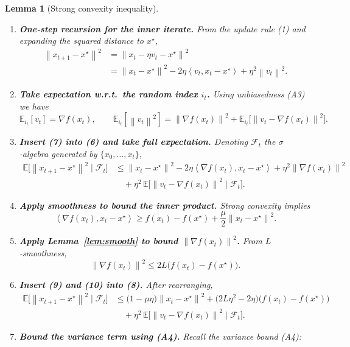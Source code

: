 \documentclass{article}
\newtheorem{lemma}{Lemma}
\newcommand{\E}{\mathbb{E}}
\newcommand{\norm}[1]{\left\lVert#1\right\rVert}
\newcommand{\inner}[2]{\left\langle #1,#2\right\rangle}
\begin{document}
\begin{lemma}[Strong convexity inequality]
\begin{enumerate}[label=[Step \arabic*], leftmargin=*]
\item \textbf{One‑step recursion for the inner iterate.}  
From the update rule (1) and expanding the squared distance to $x^\star$,
\begin{align}
    \norm{x_{t+1}-x^\star}^2
    &=\norm{x_t-\eta v_t - x^\star}^2 \nonumber\\
    &=\norm{x_t-x^\star}^2 -2\eta\inner{v_t}{x_t-x^\star}
      +\eta^2\norm{v_t}^2.
\tag{6}
\end{align}
\item \textbf{Take expectation w.r.t.\ the random index $i_t$.}  
Using unbiasedness (A3) we have
\[
    \E_{i_t}[v_t]=\nabla f(x_t),\qquad
    \E_{i_t}[\norm{v_t}^2]
    =\norm{\nabla f(x_t)}^2
      +\E_{i_t}\!\bigl[\norm{v_t-\nabla f(x_t)}^2\bigr].
\tag{7}
\]
\item \textbf{Insert (7) into (6) and take full expectation.}  
Denoting $\mathcal{F}_t$ the $\sigma$‑algebra generated by $\{x_0,\dots,x_t\}$,
\begin{align}
    \E\!\bigl[\norm{x_{t+1}-x^\star}^2\mid\mathcal{F}_t\bigr]
    &\le \norm{x_t-x^\star}^2
       -2\eta\inner{\nabla f(x_t)}{x_t-x^\star}
       +\eta^2\norm{\nabla f(x_t)}^2 \nonumber\\
    &\quad +\eta^2\,\E\!\bigl[\norm{v_t-\nabla f(x_t)}^2\mid\mathcal{F}_t\bigr].
\tag{8}
\end{align}
\item \textbf{Apply smoothness to bound the inner product.}  
Strong convexity implies
\[
    \inner{\nabla f(x_t)}{x_t-x^\star}
    \ge f(x_t)-f(x^\star)+\frac{\mu}{2}\norm{x_t-x^\star}^2.
\tag{9}
\]
\item \textbf{Apply Lemma~\ref{lem:smooth} to bound $\norm{\nabla f(x_t)}^2$.}  
From $L$‑smoothness,
\[
    \norm{\nabla f(x_t)}^2
    \le 2L\bigl(f(x_t)-f(x^\star)\bigr).
\tag{10}
\]
\item \textbf{Insert (9) and (10) into (8).}  After rearranging,
\begin{align}
    \E\!\bigl[\norm{x_{t+1}-x^\star}^2\mid\mathcal{F}_t\bigr]
    &\le \bigl(1-\mu\eta\bigr)\norm{x_t-x^\star}^2
       +\bigl(2L\eta^2-2\eta\bigr)\bigl(f(x_t)-f(x^\star)\bigr) \nonumber\\
    &\quad +\eta^2\,\E\!\bigl[\norm{v_t-\nabla f(x_t)}^2\mid\mathcal{F}_t\bigr].
\tag{11}
\end{align}
\item \textbf{Bound the variance term using (A4).}  
Recall the variance bound (A4):

\end{enumerate}
\end{lemma}
\end{document}
